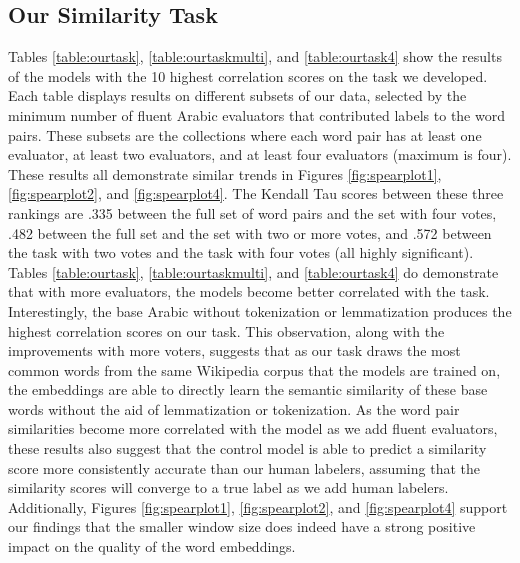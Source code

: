 \subsection{Our Similarity Task}

Tables \ref{table:ourtask}, \ref{table:ourtaskmulti}, and \ref{table:ourtask4} show the results of the models with the 10 highest correlation scores on the task we developed. Each table displays results on different subsets of our data, selected by the minimum number of fluent Arabic evaluators that contributed labels to the word pairs. These subsets are the collections where each word pair has at least one evaluator, at least two evaluators, and at least four evaluators (maximum is four). These results all demonstrate similar trends in Figures \ref{fig:spearplot1}, \ref{fig:spearplot2}, and \ref{fig:spearplot4}. The Kendall Tau scores between these three rankings are .335 between the full set of word pairs and the set with four votes, .482 between the full set and the set with two or more votes, and .572 between the task with two votes and the task with four votes (all highly significant). Tables \ref{table:ourtask}, \ref{table:ourtaskmulti}, and \ref{table:ourtask4} do demonstrate that with more evaluators, the models become better correlated with the task. Interestingly, the base Arabic without tokenization or lemmatization produces the highest correlation scores on our task. This observation, along with the improvements with more voters, suggests that as our task draws the most common words from the same Wikipedia corpus that the models are trained on, the embeddings are able to directly learn the semantic similarity of these base words without the aid of lemmatization or tokenization. As the word pair similarities become more correlated with the model as we add fluent evaluators, these results also suggest that the control model is able to predict a similarity score more consistently accurate than our human labelers, assuming that the similarity scores will converge to a true label as we add human labelers. Additionally, Figures \ref{fig:spearplot1}, \ref{fig:spearplot2}, and \ref{fig:spearplot4} support our findings that the smaller window size does indeed have a strong positive impact on the quality of the word embeddings.



